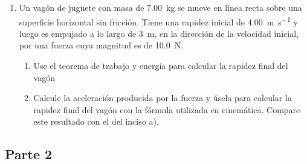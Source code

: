 \documentclass[Física - Práctica.root.tex]{subfiles}
\begin{document}
\begin{enumerate}
\begin{enumerate}
        \end{enumerate}

  \item Un vagón de juguete con masa de \SI{7,00}{\kilo\gram} se mueve en línea recta sobre una superficie
        horizontal sin fricción. Tiene una rapidez inicial de \SI{4,00}{\meter\per\second} y luego es empujado a lo
        largo de \SI{3}{\meter}, en la dirección de la velocidad inicial, por una fuerza cuya magnitud es de
        \SI{10,0}{\newton}.
        \begin{enumerate}
          \item Use el teorema de trabajo y energía para calcular la rapidez final del vagón
          \item Calcule la aceleración producida por la fuerza y úsela para calcular la rapidez final
                del vagón con la fórmula utilizada en cinemática. Compare este resultado con el del
                inciso a).
        \end{enumerate}
\end{enumerate}

\subsection{Parte 2}
\begin{enumerate}

\end{enumerate}
\end{document}
